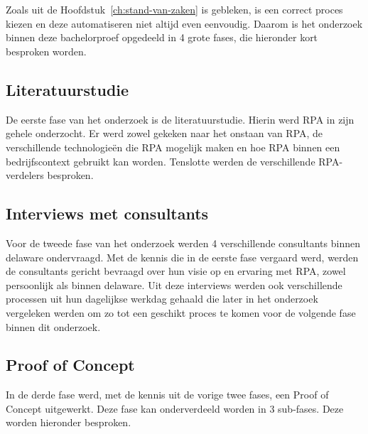
\chapter{}%
\label{ch:methodologie}

Zoals uit de Hoofdstuk~\ref{ch:stand-van-zaken} is gebleken, is een correct proces kiezen en deze automatiseren niet altijd even eenvoudig. Daarom is het onderzoek binnen deze bachelorproef opgedeeld in 4 grote fases, die hieronder kort besproken worden.

\section{Literatuurstudie}
\label{sec:literatuurstudie}

De eerste fase van het onderzoek is de literatuurstudie. Hierin werd RPA in zijn gehele onderzocht. Er werd zowel gekeken naar het onstaan van RPA, de verschillende technologieën die RPA mogelijk maken en hoe RPA binnen een bedrijfscontext gebruikt kan worden.
Tenslotte werden de verschillende RPA-verdelers besproken.

\section{Interviews met consultants}
\label{sec:interviews-consultants}

Voor de tweede fase van het onderzoek werden 4 verschillende consultants binnen delaware ondervraagd. Met de kennis die in de eerste fase vergaard werd, werden de consultants gericht bevraagd over hun visie op en ervaring met RPA, zowel persoonlijk als binnen delaware. Uit deze interviews werden ook verschillende processen uit hun dagelijkse werkdag gehaald die later in het onderzoek vergeleken werden om zo tot een geschikt proces te komen voor de volgende fase binnen dit onderzoek.

\section{Proof of Concept}
\label{sec:proof-of-concept}

In de derde fase werd, met de kennis uit de vorige twee fases, een Proof of Concept uitgewerkt. Deze fase kan onderverdeeld worden in 3 sub-fases. Deze worden hieronder besproken.

